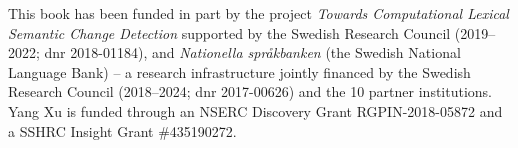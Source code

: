 This book has been funded in part by the project \textit{Towards Computational Lexical Semantic Change Detection} supported by the Swedish Research Council (2019–2022; dnr 2018-01184), and \emph{Nationella språkbanken} (the Swedish National Language Bank) -- a research infrastructure jointly financed by the Swedish Research Council (2018--2024; dnr 2017-00626) and the 10 partner institutions. Yang Xu is funded through an NSERC Discovery Grant RGPIN-2018-05872 and a SSHRC Insight Grant \#435190272.
